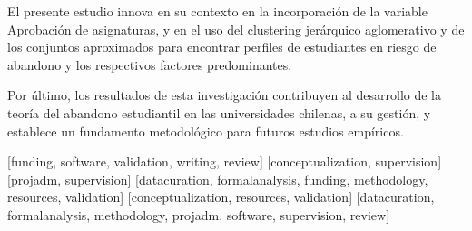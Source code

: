 \documentclass[portuguese]{textolivre}
\begin{document}
El presente estudio innova en su contexto en la incorporación de la variable Aprobación de asignaturas, y en el uso del clustering jerárquico aglomerativo y de los conjuntos aproximados para encontrar perfiles de estudiantes en riesgo de abandono y los respectivos factores predominantes.

Por último, los resultados de esta investigación contribuyen al desarrollo de la teoría del abandono estudiantil en las universidades chilenas, a su gestión, y establece un fundamento metodológico para futuros estudios empíricos.

\printbibliography


\begin{contributors}
[funding, software, validation, writing, review]
[conceptualization, supervision]
[projadm, supervision]
[datacuration, formalanalysis, funding, methodology, resources, validation]
[conceptualization, resources, validation]
[datacuration, formalanalysis, methodology, projadm, software, supervision, review]
\end{contributors}


\end{document}
